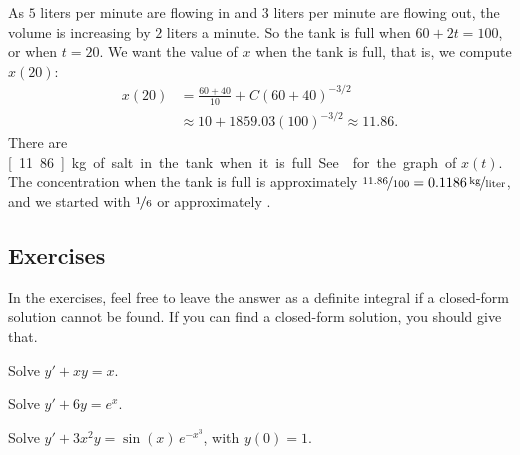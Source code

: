 \begin{example}
As $5$ liters per minute are flowing in and $3$ liters per minute are flowing out,
the volume is increasing by $2$ liters a minute.
So the tank is
full when $60+2t = 100$, or when $t=20$.
We want the value of $x$ when the tank is full,
that is, we compute $x(20)$:
\begin{equation*}
\begin{split}
x(20) & =
\frac{60+40}{10}
+C{(60+40)}^{-3/2}
\\
& \approx
10
+1859.03 {(100)}^{-3/2}
\approx
11.86 .
\end{split}
\end{equation*}
There are \unit[11.86]{kg} of salt in the tank when it is full.
See  for the graph of $x(t)$.
The concentration when the tank is full is approximately
$\nicefrac{11.86}{100} = \unitfrac[0.1186]{kg}{liter}$, and we started
with $\nicefrac{1}{6}$ or approximately .
\end{example}

\subsection{Exercises}

In the exercises, feel free to leave the answer as a definite integral if a
closed-form solution cannot be found.  If you can find a closed-form
solution, you should give that.

\begin{exercise}
Solve $y' + xy = x$.
\end{exercise}

\begin{exercise}
Solve $y' + 6y = e^x$.
\end{exercise}

\begin{exercise}
Solve $y' + 3x^2y = \sin(x) \, e^{-x^3}$, with $y(0) = 1$.
\end{exercise}

